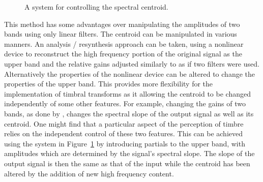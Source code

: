 			\begin{figure}[h!]
				\centering
				\caption{A system for controlling the spectral centroid.}
				\label{fig:TwoBandSpectralCentroidSystem}
			\end{figure}

			This method has some advantages over manipulating the amplitudes of two bands using only linear
			filters. The centroid can be manipulated in various manners. An analysis / resynthesis approach can
			be taken, using a nonlinear device to reconstruct the high frequency portion of the original signal
			as the upper band and the relative gains adjusted similarly to as if two filters were used.
			Alternatively the properties of the nonlinear device can be altered to change the properties of the
			upper band. This provides more flexibility for the implementation of timbral transforms as it
			allowing the centroid to be changed independently of some other features. For example, changing the
			gains of two bands, as done by \citet{zacharakis2011an}, changes the spectral slope of the output
			signal as well as its centroid. One might find that a particular aspect of the perception of timbre
			relies on the independent control of these two features. This can be achieved using the system in
			Figure~\ref{fig:TwoBandSpectralCentroidSystem} by introducing partials to the upper band, with
			amplitudes which are determined by the signal's spectral slope. The slope of the output signal is
			then the same as that of the input while the centroid has been altered by the addition of new high
			frequency content.

